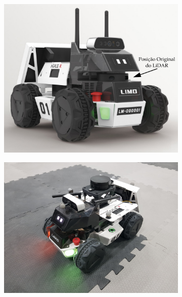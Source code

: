     \begin{figure}[htb]
        \centering
        \caption{Modificação realizada no robô móvel para uso do campo de visão total do LiDAR. À esquerda, imagem do LIMO com o sensor na posição original. À direita, imagem do robô com a estrutura modificada.}

        \begin{subfigure}[b]{0.45\textwidth}
        \centering
            \includegraphics[height=0.94\textwidth, width=\textwidth]{img/LIMO_LiDAR_2.pdf}
            
        \end{subfigure}
        \hspace{0.03\textwidth}
        \begin{subfigure}[b]{0.45\textwidth}
        \centering
            \includegraphics[trim= 700 400 700 150, clip, width=\textwidth]{img/LIMO_EXPERIMENTO.jpg}
        \end{subfigure}
        
        \source
        \label{fig:LIMO_Experimento}
    \end{figure}

